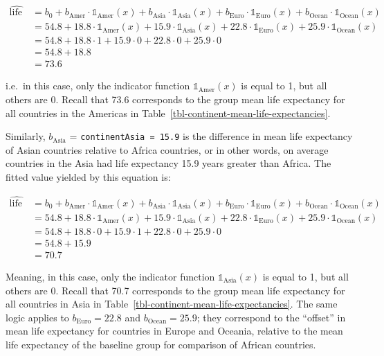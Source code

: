 \documentclass[
  letterpaper,
  DIV=11,
  numbers=noendperiod]{scrreprt}
\theoremstyle{definition}
\theoremstyle{remark}
\begin{document}
\[
\begin{aligned}
\widehat{\text{life exp}} &= b_0 + b_{\text{Amer}}\cdot\mathbb{1}_{\mbox{Amer}}(x) + b_{\text{Asia}}\cdot\mathbb{1}_{\mbox{Asia}}(x)
+ b_{\text{Euro}}\cdot\mathbb{1}_{\mbox{Euro}}(x) + b_{\text{Ocean}}\cdot\mathbb{1}_{\mbox{Ocean}}(x)\\
&= 54.8 + 18.8\cdot\mathbb{1}_{\mbox{Amer}}(x) + 15.9\cdot\mathbb{1}_{\mbox{Asia}}(x)
+ 22.8\cdot\mathbb{1}_{\mbox{Euro}}(x) + 25.9\cdot\mathbb{1}_{\mbox{Ocean}}(x)\\
&= 54.8 + 18.8\cdot 1 + 15.9\cdot 0 + 22.8\cdot 0 + 25.9\cdot 0\\
&= 54.8 + 18.8\\
&= 73.6
\end{aligned}
\]

i.e.~in this case, only the indicator function
\(\mathbb{1}_{\mbox{Amer}}(x)\) is equal to 1, but all others are 0.
Recall that 73.6 corresponds to the group mean life expectancy for all
countries in the Americas in
Table~\ref{tbl-continent-mean-life-expectancies}.

Similarly, \(b_{\text{Asia}}\) = \texttt{continentAsia\ =\ 15.9} is the
difference in mean life expectancy of Asian countries relative to Africa
countries, or in other words, on average countries in the Asia had life
expectancy 15.9 years greater than Africa. The fitted value yielded by
this equation is:

\[
\begin{aligned}
\widehat{\text{life exp}} &= b_0 + b_{\text{Amer}}\cdot\mathbb{1}_{\mbox{Amer}}(x) + b_{\text{Asia}}\cdot\mathbb{1}_{\mbox{Asia}}(x)
+ b_{\text{Euro}}\cdot\mathbb{1}_{\mbox{Euro}}(x) + b_{\text{Ocean}}\cdot\mathbb{1}_{\mbox{Ocean}}(x)\\
&= 54.8 + 18.8\cdot\mathbb{1}_{\mbox{Amer}}(x) + 15.9\cdot\mathbb{1}_{\mbox{Asia}}(x)
+ 22.8\cdot\mathbb{1}_{\mbox{Euro}}(x) + 25.9\cdot\mathbb{1}_{\mbox{Ocean}}(x)\\
&= 54.8 + 18.8\cdot 0 + 15.9\cdot 1 + 22.8\cdot 0 + 25.9\cdot 0\\
&= 54.8 + 15.9\\
&= 70.7
\end{aligned}
\]

Meaning, in this case, only the indicator function
\(\mathbb{1}_{\mbox{Asia}}(x)\) is equal to 1, but all others are 0.
Recall that 70.7 corresponds to the group mean life expectancy for all
countries in Asia in Table~\ref{tbl-continent-mean-life-expectancies}.
The same logic applies to \(b_{\text{Euro}} = 22.8\) and
\(b_{\text{Ocean}} = 25.9\); they correspond to the ``offset'' in mean
life expectancy for countries in Europe and Oceania, relative to the
mean life expectancy of the baseline group for comparison of African
countries.
\end{document}
